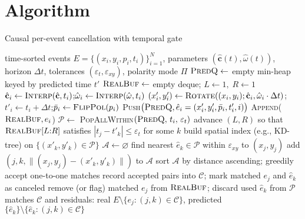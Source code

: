 \section{Algorithm}
\begin{algorithm}[H] %
\caption{Causal per-event cancellation with temporal gate}
\label{alg:cancellation}
\begin{algorithmic}[1]
\Require time-sorted events $E=\{(x_i,y_i,p_i,t_i)\}_{i=1}^N$, parameters $(\hat{\mathbf c}(t),\hat{\omega}(t))$, horizon $\Delta t$, tolerances $(\varepsilon_t,\varepsilon_{xy})$, polarity mode $\Pi$
\State $\textsc{PredQ}\gets$ empty min-heap keyed by predicted time $t'$
\State $\textsc{RealBuf}\gets$ empty deque; \quad $L\gets 1,\; R\gets 1$
  \State $\hat{\mathbf c}_i \gets \textsc{Interp}(\hat{\mathbf c},t_i)$;\quad $\hat{\omega}_i \gets \textsc{Interp}(\hat{\omega},t_i)$
  \State $(x'_i,y'_i)\gets \textsc{Rotate}((x_i,y_i);\hat{\mathbf c}_i,\hat{\omega}_i\cdot \Delta t)$;\quad $t'_i\gets t_i+\Delta t$;\quad $\bar p_i\gets \textsc{FlipPol}(p_i)$
  \State \textsc{Push}$\big(\textsc{PredQ},\hat e_i=(x'_i,y'_i,\bar p_i,t'_i,i)\big)$
  \State \textsc{Append}($\textsc{RealBuf}, e_i$)
     \State $\mathcal{P}\gets$ \textsc{PopAllWithin}$(\textsc{PredQ},\,t_i,\,\varepsilon_t)$ 
     \State advance $(L,R)$ so that $\textsc{RealBuf}[L{:}R]$ satisfies $|t_j - t'_k|\le \varepsilon_t$ for some $k$ \label{ln:window}
     \State build spatial index (e.g., KD-tree) on $\{(x'_k,y'_k)\in\mathcal{P}\}$
     \State $\mathcal{A}\gets\varnothing$ 
        \State find nearest $\hat e_k\in\mathcal{P}$ within $\varepsilon_{xy}$ to $(x_j,y_j)$
            \State add $(j,k,\| (x_j,y_j)-(x'_k,y'_k)\|)$ to $\mathcal{A}$
        \EndIf
     \EndFor
     \State sort $\mathcal{A}$ by distance ascending; greedily accept one-to-one matches
     \State record accepted pairs into $\mathcal{C}$; mark matched $e_j$ and $\hat e_k$ as canceled
     \State remove (or flag) matched $e_j$ from $\textsc{RealBuf}$; discard used $\hat e_k$ from $\mathcal{P}$
  \EndWhile
\EndFor
\State \Return matches $\mathcal{C}$ and residuals: real $E\setminus\{e_j:(j,k)\in\mathcal{C}\}$, predicted $\{\hat e_k\}\setminus\{\hat e_k:(j,k)\in\mathcal{C}\}$
\end{algorithmic}
\end{algorithm}


